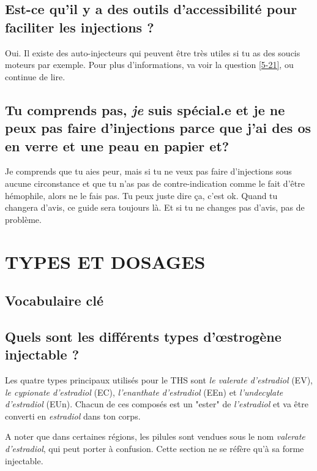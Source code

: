 \documentclass{article}
\begin{document}
\subsection{Est-ce qu'il y a des outils d'accessibilité pour faciliter les injections ?}

Oui. Il existe des auto-injecteurs qui peuvent être très utiles si tu as des soucis moteurs par exemple. Pour plus d'informations, va voir la question \ref{5-21}, ou continue de lire.

\subsection{Tu comprends pas, \textit{je} suis spécial.e et je ne peux pas faire d'injections parce que j'ai des os en verre et une peau en papier et\textemdash{}?}

Je comprends que tu aies peur, mais si tu ne veux pas faire d'injections sous aucune circonstance et que tu n'as pas de contre-indication comme le fait d'être hémophile, alors ne le fais pas. Tu peux juste dire ça, c'est ok. Quand tu changera d'avis, ce guide sera toujours là. Et si tu ne changes pas d'avis, pas de problème.


\section{TYPES ET DOSAGES}\label{td}

\subsection*{Vocabulaire clé}

\subsection{Quels sont les différents types d'œstrogène injectable ?}

Les quatre types principaux utilisés pour le THS sont \textit{le valerate d'estradiol} (EV), \textit{le cypionate d'estradiol} (EC), \textit{l'enanthate d'estradiol} (EEn) et \textit{l'undecylate d'estradiol} (EUn). Chacun de ces composés est un "ester" de \textit{l'estradiol} et va être converti en \textit{estradiol} dans ton corps.

A noter que dans certaines régions, les pilules sont vendues sous le nom \textit{valerate d'estradiol}, qui peut porter à confusion. Cette section ne se réfère qu'à sa forme injectable.
\end{document}
